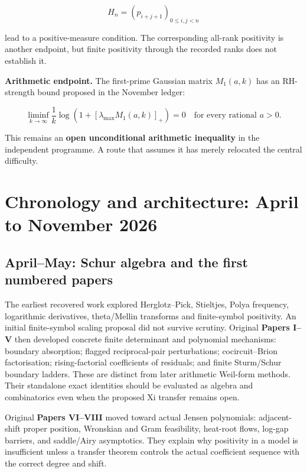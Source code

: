 \documentclass[
  10pt,
  a4paper,
  10pt,
  oneside,
  openany]{book}
\begin{document}
\[
H_n=(p_{i+j+1})_{0\le i,j<n}
\tag{S1.4}\label{eq:S1.4}
\]

lead to a positive-measure condition. The corresponding all-rank
positivity is another endpoint, but finite positivity through the
recorded ranks does not establish it.

\textbf{Arithmetic endpoint.} The first-prime Gaussian matrix
\(M_1(a,k)\) has an RH-strength bound proposed in the November ledger:

\[
\boxed{\quad
\liminf_{k\to\infty}\frac1k
\log\!\left(1+[\lambda_{\max}M_1(a,k)]_+\right)=0
\quad\text{for every rational }a>0.\quad}
\tag{S1.5}\label{eq:S1.5}
\]

This remains an \textbf{open unconditional arithmetic inequality} in the
independent programme. A route that assumes it has merely relocated the
central difficulty.

\section{Chronology and architecture: April to November
2026}\label{chronology-and-architecture-april-to-november-2026}

\subsection{April--May: Schur algebra and the first numbered
papers}\label{aprilmay-schur-algebra-and-the-first-numbered-papers}

The earliest recovered work explored Herglotz--Pick, Stieltjes,
P\textquotesingle olya frequency, logarithmic derivatives, theta/Mellin
transforms and finite-symbol positivity. An initial finite-symbol
scaling proposal did not survive scrutiny. Original \textbf{Papers I--V}
then developed concrete finite determinant and polynomial mechanisms:
boundary absorption; flagged reciprocal-pair perturbations;
cocircuit--Brion factorisation; rising-factorial coefficients of
residuals; and finite Sturm/Schur boundary ladders. These are distinct
from later arithmetic Weil-form methods. Their standalone exact
identities should be evaluated as algebra and combinatorics even when
the proposed Xi transfer remains open.

Original \textbf{Papers VI--VIII} moved toward actual Jensen
polynomials: adjacent-shift proper position, Wronskian and Gram
feasibility, heat-root flows, log-gap barriers, and saddle/Airy
asymptotics. They explain why positivity in a model is insufficient
unless a transfer theorem controls the actual coefficient sequence with
the correct degree and shift.
\end{document}
